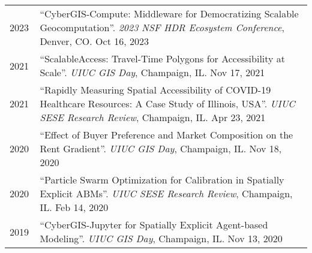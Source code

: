 \documentclass{acmcv}
\begin{document}

    \begin{longtable}{p{0.1\linewidth} p{0.9\linewidth}}
        2023 & ``CyberGIS-Compute: Middleware for Democratizing Scalable Geocomputation''. \textit{2023 NSF HDR Ecosystem Conference}, Denver, CO. Oct 16, 2023 \\

        2021 & ``ScalableAccess: Travel-Time Polygons for Accessibility at Scale''. \textit{UIUC GIS Day}, Champaign, IL. Nov 17, 2021 \\

        2021 & ``Rapidly Measuring Spatial Accessibility of COVID-19 Healthcare Resources: A Case Study of Illinois, USA''. \textit{UIUC SESE Research Review}, Champaign, IL. Apr 23, 2021 \\ 

        2020 & ``Effect of Buyer Preference and Market Composition on the Rent Gradient''. \textit{UIUC GIS Day}, Champaign, IL. Nov 18, 2020 \\

        2020 & ``Particle Swarm Optimization for Calibration in Spatially Explicit ABMs''. \textit{UIUC SESE Research Review}, Champaign, IL. Feb 14, 2020 \\ 

        2019 & ``CyberGIS-Jupyter for Spatially Explicit Agent-based Modeling''. \textit{UIUC GIS Day}, Champaign, IL. Nov 13, 2020 \\

    \end{longtable}




\end{document}

